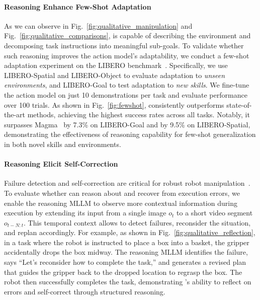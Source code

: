 \paragraph{Reasoning Enhance Few-Shot Adaptation}
As we can observe in Fig.~\ref{fig:qualitative_manipulation} and Fig.~\ref{fig:qualitative_comparisons}, \ours{} is capable of describing the environment and decomposing task instructions into meaningful sub-goals. To validate whether such reasoning improves the action model's adaptability, we conduct a few-shot adaptation experiment on the LIBERO benchmark~\cite{liu2023libero}. Specifically, we use LIBERO-Spatial and LIBERO-Object to evaluate adaptation to \textit{unseen environments}, and LIBERO-Goal to test adaptation to \textit{new skills}. We fine-tune the action model on just 10 demonstrations per task and evaluate performance over 100 trials. As shown in Fig.~\ref{fig:fewshot}, \ours{} consistently outperforms state-of-the-art methods, achieving the highest success rates across all tasks. Notably, it surpasses Magma~\cite{yang2025magma} by 7.3\% on LIBERO-Goal and by 9.5\% on LIBERO-Spatial, demonstrating the effectiveness of reasoning capability for few-shot generalization in both novel skills and environments.

\paragraph{Reasoning Elicit Self-Correction}
Failure detection and self-correction are critical for robust robot manipulation~\cite{liu2023reflect}. To evaluate whether \ours{} can reason about and recover from execution errors, we enable the reasoning MLLM to observe more contextual information during execution by extending its input from a single image $o_t$ to a short video segment $o_{t-N:t}$. This temporal context allows \ours{} to detect failures, reconsider the situation, and replan accordingly. For example, as shown in Fig.~\ref{fig:qualitative_reflection}, in a task where the robot is instructed to place a box into a basket, the gripper accidentally drops the box midway. The reasoning MLLM identifies the failure, says “Let's reconsider how to complete the task,” and generates a revised plan that guides the gripper back to the dropped location to regrasp the box. The robot then successfully completes the task, demonstrating \ours{}'s ability to reflect on errors and self-correct through structured reasoning.
